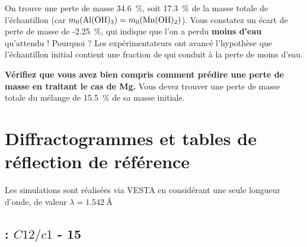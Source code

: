 \documentclass[twoside,a4paper,11pt,addpoints,answers]{exam}%
\begin{document}
On trouve une perte de masse \SI{34.6}{\percent}, soit \SI{17.3}{\percent} de la masse totale de l'échantillon (car $m_0 ( \ce{Al(OH)3} ) = m_0 (\ce{Mn(OH)2})$). Vous constatez un écart de perte de masse de -\SI{2.25}{\percent}, qui indique que l'on a perdu \textbf{moins d'eau} qu'attendu ! Pourquoi ? Les expérimentateurs ont avancé l'hypothèse que l'échantillon initial contient une fraction de  qui conduit à la perte de moins d'eau.

\textbf{Vérifiez que vous avez bien compris comment prédire une perte de masse en traitant le cas de Mg.} Vous devez trouver une perte de masse totale du mélange de \SI{15.5}{\percent} de sa masse initiale.







\newpage

\section{Diffractogrammes et tables de réflection de référence}
\label{sec:diffracto}
Les simulations sont réalisées via VESTA en considérant une seule longueur d'onde, de valeur $\lambda = 1.542 ~ \si{\angstrom}$

\subsection{ : $C12/c1$ - 15}
\end{document}
